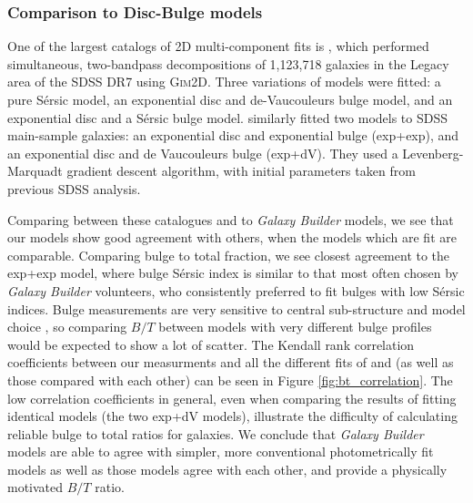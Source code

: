 \documentclass[../main.tex]{subfiles}
\begin{document}
\subsubsection{Comparison to Disc-Bulge models}

One of the largest catalogs of 2D multi-component fits is \citet{2011ApJS..196...11S}, which performed simultaneous, two-bandpass decompositions of 1,123,718 galaxies in the Legacy area of the SDSS DR7 using \textsc{Gim2D}. Three variations of models were fitted: a pure S\'ersic model, an exponential disc and de-Vaucouleurs bulge model, and an exponential disc and a S\'ersic bulge model. \citet{2012MNRAS.421.2277L} similarly fitted two models to SDSS main-sample galaxies: an exponential disc and exponential bulge (exp+exp), and an exponential disc and de Vaucouleurs bulge (exp+dV). They used a Levenberg-Marquadt gradient descent algorithm, with initial parameters taken from previous SDSS analysis.

Comparing between these catalogues and to \textit{Galaxy Builder} models, we see that our models show good agreement with others, when the models which are fit are comparable. Comparing bulge to total fraction, we see closest agreement to the exp+exp model, where bulge S\'ersic index is similar to that most often chosen by \textit{Galaxy Builder} volunteers, who consistently preferred to fit bulges with low S\'ersic indices. Bulge measurements are very sensitive to central sub-structure and model choice \citep{Gao2017:1709.00746v1}, so comparing $B/T$ between models with very different bulge profiles would be expected to show a lot of scatter. The Kendall rank correlation coefficients between our measurments and all the different fits of \citet{2011ApJS..196...11S} and \citet{2012MNRAS.421.2277L} (as well as those compared with each other) can be seen in Figure \ref{fig:bt_correlation}. The low correlation coefficients in general, even when comparing the results of fitting identical models (the two exp+dV models), illustrate the difficulty of calculating reliable bulge to total ratios for galaxies. We conclude that \textit{Galaxy Builder} models are able to agree with simpler, more conventional photometrically fit models as well as those models agree with each other, and provide a physically motivated $B/T$ ratio.
\end{document}
